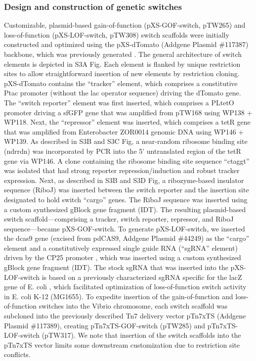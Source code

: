 \subsubsection{Design and construction of genetic switches}
Customizable, plasmid-based gain-of-function (pXS-GOF-switch, pTW265) and loss-of-function (pXS-LOF-switch, pTW308) switch scaffolds were initially constructed and optimized using the pXS-dTomato (Addgene Plasmid \#117387) backbone, which was previously generated \cite{wiles_modernized_2018}. The general architecture of switch elements is depicted in S3A Fig. Each element is flanked by unique restriction sites to allow straightforward insertion of new elements by restriction cloning. pXS-dTomato contains the ``tracker'' element, which comprises a constitutive Ptac promoter (without the lac operator sequence) \cite{wiles_modernized_2018} driving the dTomato gene. The ``switch reporter'' element was first inserted, which comprises a PLtetO promoter \cite{lutz_independent_1997} driving a sfGFP gene that was amplified from pTW168 using WP138 + WP118. Next, the ``repressor'' element was inserted, which comprises a tetR gene that was amplified from Enterobacter ZOR0014 genomic DNA using WP146 + WP139. As described in S3B and S3C Fig, a near-random ribosome binding site (ndrrdn) was incorporated by PCR into the 5' untranslated region of the tetR gene via WP146. A clone containing the ribosome binding site sequence ``ctaggt'' was isolated that had strong reporter repression/induction and robust tracker expression. Next, as described in S3B and S3D Fig, a ribozyme-based insulator sequence (RiboJ) \cite{lou_ribozyme-based_2012} was inserted between the switch reporter and the insertion site designated to hold switch ``cargo'' genes. The RiboJ sequence was inserted using a custom synthesized gBlock gene fragment (IDT). The resulting plasmid-based switch scaffold—comprising a tracker, switch reporter, repressor, and RiboJ sequence—became pXS-GOF-switch. To generate pXS-LOF-switch, we inserted the dcas9 gene \cite{qi_repurposing_2013} (excised from pdCAS9, Addgene Plasmid \#44249) as the ``cargo'' element and a constitutively expressed single guide RNA (``sgRNA'' element) driven by the CP25 promoter \cite{jensen_sequence_1998}, which was inserted using a custom synthesized gBlock gene fragment (IDT). The stock sgRNA that was inserted into the pXS-LOF-switch is based on a previously characterized sgRNA specific for the lacZ gene of E. coli \cite{qi_repurposing_2013}, which facilitated optimization of loss-of-function switch activity in E. coli K-12 (MG1655). To expedite insertion of the gain-of-function and loss-of-function switches into the Vibrio chromosome, each switch scaffold was subcloned into the previously described Tn7 delivery vector pTn7xTS (Addgene Plasmid \#117389), creating pTn7xTS-GOF-switch (pTW285) and pTn7xTS-LOF-switch (pTW317). We note that insertion of the switch scaffolds into the pTn7xTS vector limits some downstream customization due to restriction site conflicts.

